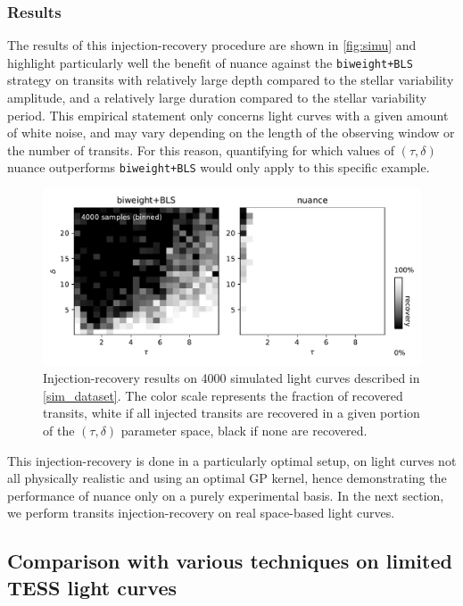 \documentclass[modern]{aastex631}
\newcommand{\wtls}{\texttt{biweight+BLS}}
\begin{document}
\subsubsection*{Results}
The results of this injection-recovery procedure are shown in \autoref{fig:simu} and highlight particularly well the benefit of \textsf{nuance} against the \wtls{} strategy on transits with relatively large depth compared to the stellar variability amplitude, and a relatively large duration compared to the stellar variability period. This empirical statement only concerns light curves with a given amount of white noise, and may vary depending on the length of the observing window or the number of transits. For this reason, quantifying for which values of $(\tau, \delta)$ \textsf{nuance} outperforms \wtls{} would only apply to this specific example.
\begin{figure}[H]
    \begin{centering}
        \includegraphics[width=\linewidth]{../workflows/synthetic-injection-recovery/figures/synthetic_ir.pdf}
        \caption{Injection-recovery results on 4000 simulated light curves described in \autoref{sim_dataset}. The color scale represents the fraction of recovered transits, white if all injected transits are recovered in a given portion of the $(\tau, \delta)$ parameter space, black if none are recovered.}
        \label{fig:simu}
    \end{centering}
\end{figure}

\noindent This injection-recovery is done in a particularly optimal setup, on light curves not all physically realistic and using an optimal GP kernel, hence demonstrating the performance of \textsf{nuance} only on a purely experimental basis. In the next section, we perform transits injection-recovery on real space-based light curves.

\newpage
\subsection{Comparison with various techniques on limited TESS light curves}\label{real}
\end{document}

